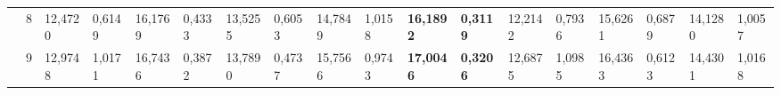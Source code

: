 \documentclass[conference]{IEEEtran}
\begin{document}
\begin{table*}[]
\begin{tabular}{|cc|ll|ll|ll|ll|ll|ll|ll|ll|}
		\multicolumn{1}{|c|}{}                    & 8          & \multicolumn{1}{l|}{12,4720}           & 0,6149                            & \multicolumn{1}{l|}{16,1769}           & 0,4333                            & \multicolumn{1}{l|}{13,5255}           & 0,6053                            & \multicolumn{1}{l|}{14,7849}           & 1,0158                            & \multicolumn{1}{l|}{\textbf{16,1892}}  & \textbf{0,3119}                   & \multicolumn{1}{l|}{12,2142}           & 0,7936                            & \multicolumn{1}{l|}{15,6261}           & 0,6879                            & \multicolumn{1}{l|}{14,1280}           & 1,0057                            \\ \cline{2-18} 
		\multicolumn{1}{|c|}{}                    & 9          & \multicolumn{1}{l|}{12,9748}           & 1,0171                            & \multicolumn{1}{l|}{16,7436}           & 0,3872                            & \multicolumn{1}{l|}{13,7890}           & 0,4737                            & \multicolumn{1}{l|}{15,7566}           & 0,9743                            & \multicolumn{1}{l|}{\textbf{17,0046}}  & \textbf{0,3206}                   & \multicolumn{1}{l|}{12,6875}           & 1,0985                            & \multicolumn{1}{l|}{16,4363}           & 0,6123                            & \multicolumn{1}{l|}{14,4301}           & 1,0168                            \\ \hline
	\end{tabular}

\end{table*}
\end{document}
